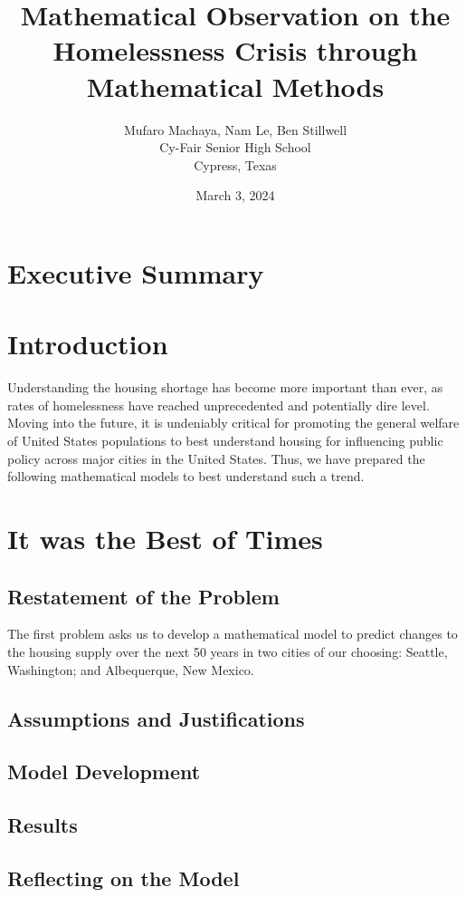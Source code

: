 \documentclass[12pt]{article}
\title{Mathematical Observation on the Homelessness Crisis through Mathematical Methods}
\author{Mufaro Machaya, Nam Le, Ben Stillwell \\ Cy-Fair Senior High School \\ Cypress, Texas}
\date{March 3, 2024}
\begin{document}
\newpage

\section*{Executive Summary}
\blindtext

\maketitle
\newpage
\tableofcontents

\newpage

\section{Introduction}
Understanding the housing shortage has become more important than ever, as rates of homelessness have reached
unprecedented and potentially dire level\cite{Census2010ACSDP1Y2010.DP04}. Moving into the future, it is
undeniably critical for promoting the general welfare of United States populations to best understand housing for
influencing public policy across major cities in the United States. Thus, we have prepared the following mathematical
models to best understand such a trend.

\newpage

\section{It was the Best of Times}

\subsection{Restatement of the Problem}
The first problem asks us to develop a mathematical model to predict changes to the housing supply over the next 50
years in two cities of our choosing: Seattle, Washington; and Albequerque, New Mexico.

\subsection{Assumptions and Justifications}
\subsection{Model Development}
\subsection{Results}
\subsection{Reflecting on the Model}
\end{document}
